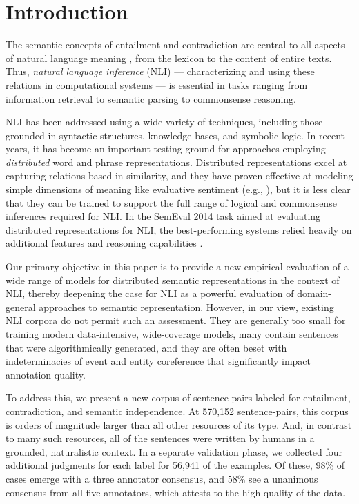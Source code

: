 \section{Introduction}\label{sec:introduction}

The semantic concepts of entailment and contradiction are central to
all aspects of natural language meaning
\cite{Katz72,vanBenthem08NATLOG}, from the lexicon to the content of
entire texts. Thus, \emph{natural language
  inference} (NLI) --- characterizing and using these relations in
computational systems
\cite{dagan2006pascal,MacCartney09,maccartney2009extended} --- is
essential in tasks ranging from information retrieval to semantic
parsing to commonsense reasoning.

NLI has been addressed using a wide variety of techniques, including
those grounded in syntactic structures, knowledge bases, and symbolic
logic. In recent years, it has become an important testing ground for
approaches employing \emph{distributed} word and phrase
representations. Distributed representations excel at capturing
relations based in similarity, and they have proven effective at
modeling simple dimensions of meaning like evaluative sentiment
(e.g., \citealt{socher2013acl1}), but it is less clear that they can be
trained to support the full range of logical and commonsense
inferences required for NLI. In the SemEval 2014 task aimed at evaluating distributed
representations for NLI, the best-performing systems relied heavily on
additional features and reasoning capabilities
\cite{marelli2014semeval}. 

Our primary objective in this paper is to provide a new empirical
evaluation of a wide range of models for distributed semantic
representations in the context of NLI, thereby deepening the case for
NLI as a powerful evaluation of domain-general approaches to semantic
representation. However, in our view, existing NLI corpora do not
permit such an assessment. They are generally too small for training
modern data-intensive, wide-coverage models, many contain sentences
that were algorithmically generated, and they are often beset with
indeterminacies of event and entity coreference that significantly
impact annotation quality.

To address this, we present a new corpus of sentence pairs labeled for
entailment, contradiction, and semantic independence. At 570,152
sentence-pairs, this corpus is orders of magnitude larger than all
other resources of its type. And, in contrast to many such resources,
all of the sentences were written by humans in a grounded,
naturalistic context. In a separate validation phase, we collected
four additional judgments for each label for 56,941 of the examples.
Of these, 98\% of cases emerge with a three annotator consensus, 
and 58\% see a unanimous consensus from all five annotators, 
which attests to the high quality of the data.

